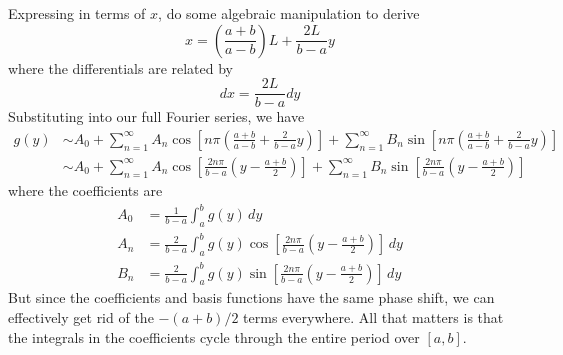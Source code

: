 \documentclass[a4paper]{article}
\begin{document}
Expressing in terms of \( x \), do some algebraic manipulation to derive
\[
	x = \!\left( \frac{a + b}{a - b} \right)L + \frac{2L}{b - a}y
\]
where the differentials are related by
\[
	dx = \frac{2L}{b - a}dy
\]
Substituting into our full Fourier series, we have
\begin{align*}
	g \!\left( y \right) & \sim A_{0} + \sum^{\infty}_{n=1} A_{n}\cos\!\left[n \pi \!\left( \frac{a + b}{a - b} + \frac{2}{b - a}y \right) \right] + \sum^{\infty}_{n=1} B_{n}\sin\!\left[n \pi \!\left( \frac{a + b}{a - b} + \frac{2}{b - a}y \right) \right] \\
			     & \sim  A_{0} + \sum^{\infty}_{n=1} A_{n}\cos\!\left[ \frac{2n \pi}{b - a}\!\left( y - \frac{a + b}{2} \right) \right] + \sum^{\infty}_{n=1} B_{n}\sin\!\left[ \frac{2n \pi}{b - a}\!\left( y - \frac{a + b}{2} \right) \right]
\end{align*}
where the coefficients are 
\begin{align*}
	A_{0} & = \frac{1}{b - a}\int^{b}_{a} g \!\left( y \right) \, dy \\
	A_{n} & = \frac{2}{b - a}\int^{b}_{a} g \!\left( y \right)\cos\!\left[ \frac{2n \pi}{b - a}\!\left( y - \frac{a + b}{2} \right) \right] \, dy  \\
	B_{n} & = \frac{2}{b - a}\int^{b}_{a} g \!\left( y \right)\sin\!\left[ \frac{2n \pi}{b - a}\!\left( y - \frac{a + b}{2} \right) \right] \, dy 
\end{align*}
But since the coefficients and basis functions have the same phase shift, we can effectively get rid of the \( -\!\left( a + b \right) / 2 \) terms everywhere. All that matters is that the integrals in the coefficients cycle through the entire period over \( \!\left[ a,b \right] \).

\vspace{12pt}

\end{document}
